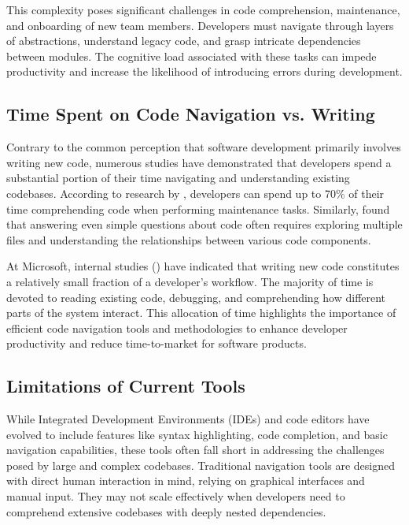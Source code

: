 \documentclass[12pt,oneside]{article}
\begin{document}
This complexity poses significant challenges in code comprehension, maintenance, and onboarding of new team members. Developers must 
navigate through layers of abstractions, understand legacy code, and grasp intricate dependencies between modules. The cognitive load 
associated with these tasks can impede productivity and increase the likelihood of introducing errors during development.

\subsection{Time Spent on Code Navigation vs. Writing}

Contrary to the common perception that software development primarily involves writing new code, numerous studies have
demonstrated that developers spend a substantial portion of their time navigating and understanding existing codebases.
According to research by \citep{ko2006exploratory}, developers can spend up to 70\% of their time comprehending code
when performing maintenance tasks. Similarly, \citep{Schroer_2024} found that answering even simple questions
about code often requires exploring multiple files and understanding the relationships between various code components.

At Microsoft, internal studies (\citep{meyer2021today}) have indicated that writing new code constitutes a relatively small 
fraction of a developer’s workflow. The majority of time is devoted to reading existing code,
debugging, and comprehending how different parts of the system interact. This allocation of time 
highlights the importance of efficient code navigation tools and methodologies to enhance developer
productivity and reduce time-to-market for software products.


\subsection{Limitations of Current Tools}

While Integrated Development Environments (IDEs) and code editors have evolved to include 
features like syntax highlighting, code completion, and basic navigation capabilities, these 
tools often fall short in addressing the challenges posed by large and complex codebases. Traditional
navigation tools are designed with direct human interaction in mind, relying on graphical interfaces and manual input.
They may not scale effectively when developers need to comprehend extensive codebases with deeply nested dependencies.
\end{document}
